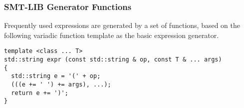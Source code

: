 
\newpage
\subsubsection{SMT-LIB Generator Functions}





Frequently used \SMTLIB expressions are generated by a set of functions, based on the following variadic function template as the basic expression generator.

\begin{lstlisting}[style=c++]
template <class ... T>
std::string expr (const std::string & op, const T & ... args)
{
  std::string e = '(' + op;
  (((e += ' ') += args), ...);
  return e += ')';
}
\end{lstlisting}

